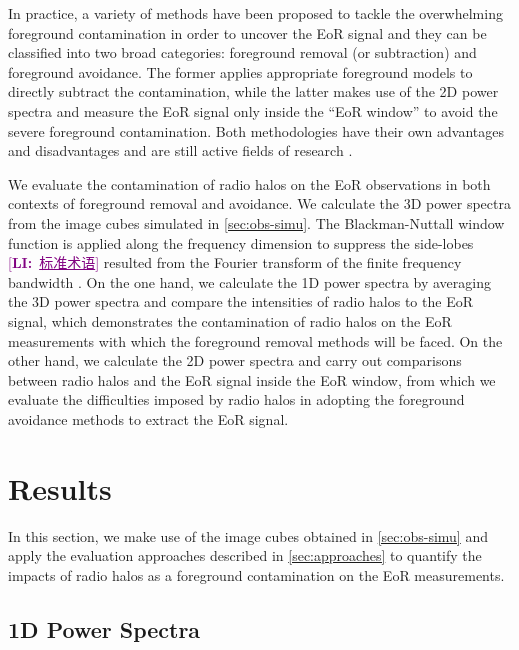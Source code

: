 \documentclass[modern]{aastex62}
\newcommand{\LI}[1]{\textcolor{purple}{[\textbf{LI:}~\uline{#1}]}}
\begin{document}
{\color{cyan}%
In practice, a variety of methods have been proposed to tackle the
overwhelming foreground contamination in order to uncover the EoR signal
and they can be classified into two broad categories:
foreground removal (or subtraction) and foreground avoidance.
The former applies appropriate foreground models to directly subtract
the contamination, while the latter makes use of the 2D power spectra
and measure the EoR signal only inside the \enquote{EoR window} to avoid
the severe foreground contamination.
Both methodologies have their own advantages and disadvantages and
are still active fields of research
\citep[see][and references therein]{chapman2016}.

We evaluate the contamination of radio halos on the EoR observations
in both contexts of foreground removal and avoidance.
We calculate the 3D power spectra from the image cubes
simulated in \autoref{sec:obs-simu}.
The Blackman-Nuttall window function is applied along the frequency
dimension to suppress the side-lobes \LI{标准术语}
resulted from the Fourier transform
of the finite frequency bandwidth \citep[e.g.,][]{trott2015,chapman2016}.
On the one hand, we calculate the 1D power spectra by averaging the 3D
power spectra and compare the intensities of radio halos to the EoR
signal, which demonstrates the contamination of radio halos on the EoR
measurements with which the foreground removal methods will be faced.
On the other hand, we calculate the 2D power spectra and carry out
comparisons between radio halos and the EoR signal inside the EoR window,
from which we evaluate the difficulties imposed by radio halos in
adopting the foreground avoidance methods to extract the EoR signal.
} %


\section{Results}
\label{sec:results}

{\color{cyan}%
In this section, we make use of the image cubes obtained in
\autoref{sec:obs-simu} and apply the evaluation approaches described in
\autoref{sec:approaches} to quantify the impacts of radio halos as a
foreground contamination on the EoR measurements.} %

\subsection{1D Power Spectra}
\label{sec:ps1d}
\end{document}

